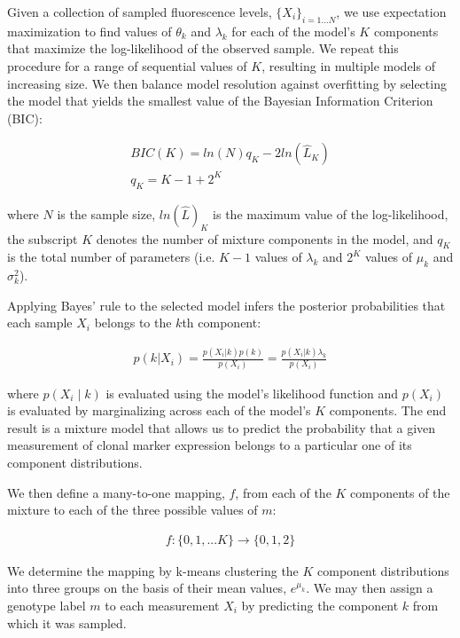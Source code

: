 \documentclass[10pt,letterpaper]{article}
\begin{document}
Given a collection of sampled fluorescence levels, $\{X_i\}_{i=1 \ldots N}$, we use expectation maximization to find values of $\theta_k$ and $\lambda_k$ for each of the model's $K$ components that maximize the log-likelihood of the observed sample. We repeat this procedure for a range of sequential values of $K$, resulting in multiple models of increasing size. We then balance model resolution against overfitting by selecting the model that yields the smallest value of the Bayesian Information Criterion (BIC):
\begin{linenomath} \begin{gather}
BIC(K) = ln(N)q_K - 2 ln(\hat{L}_K)\\
q_K = K-1 + 2^K
\end{gather} \end{linenomath}
where $N$ is the sample size, $ln(\hat{L})_K$ is the maximum value of the log-likelihood, the subscript $K$ denotes the number of mixture components in the model, and $q_K$ is the total number of parameters (i.e. $K-1$ values of $\lambda_k$ and $2^K$ values of $\mu_k$ and $\sigma_k^2$).

Applying Bayes' rule to the selected model infers the posterior probabilities that each sample $X_i$ belongs to the $k$th component:
\begin{linenomath} \begin{gather}
p(k|X_i) = \frac{p(X_i | k) p(k)}{p(X_i)} = \frac{p(X_i | k) \lambda_k}{p(X_i)}
\end{gather} \end{linenomath}
where $p(X_i \mid k)$ is evaluated using the model's likelihood function and $p(X_i)$ is evaluated by marginalizing across each of the model's $K$ components. The end result is a mixture model that allows us to predict the probability that a given measurement of clonal marker expression belongs to a particular one of its component distributions.

We then define a many-to-one mapping, $f$, from each of the $K$ components of the mixture to each of the three possible values of $m$:
\begin{linenomath} \begin{gather}
f: \{0,1,...K\} \to \{0,1,2\}
\end{gather} \end{linenomath}
We determine the mapping by k-means clustering the $K$ component distributions into three groups on the basis of their mean values, $e^{\mu_k}$. We may then assign a genotype label $m$ to each measurement $X_i$ by predicting the component $k$ from which it was sampled. 
\end{document}
